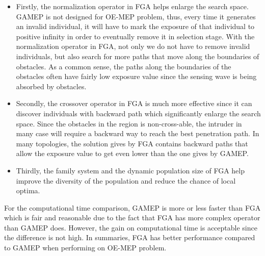 \documentclass[final]{elsarticle}
\begin{document}
\begin{itemize}
	\item Firstly, the normalization operator in FGA helps enlarge the search space. GAMEP is not designed for OE-MEP problem, thus, every time it generates an invalid individual, it will have to mark the exposure of that individual to positive infinity in order to eventually remove it in selection stage. With the normalization operator in FGA, not only we do not have to remove invalid individuals, but also search for more paths that move along the boundaries of obstacles. As a common sense, the paths along the boundaries of the obstacles often have fairly low exposure value since the sensing wave is being absorbed by obstacles. 
	\item Secondly, the crossover operator in FGA is much more effective since it can discover individuals with backward path which significantly enlarge the search space. Since the obstacles in the region is non-cross-able, the intruder in many case will require a backward way to reach the best penetration path. In many topologies, the solution gives by FGA contains backward paths that allow the exposure value to get even lower than the one gives by GAMEP. 
	\item Thirdly, the family system and the dynamic population size of FGA help improve the diversity of the population and reduce the chance of local optima. 
\end{itemize}
For the computational time comparison, GAMEP is more or less faster than FGA which is fair and reasonable due to the fact that FGA has more complex operator than GAMEP does. However, the gain on computational time is acceptable since the difference is not high. In summaries, FGA has better performance compared to GAMEP when performing on OE-MEP problem. 
\end{document}
